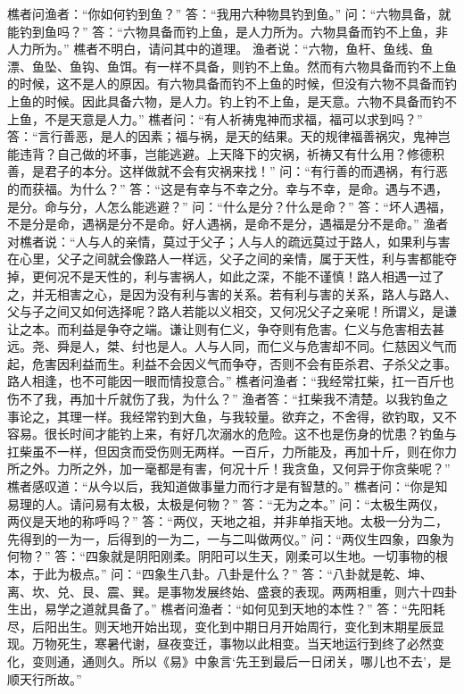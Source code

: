 \documentclass[12pt,UTF8]{ctexbook}
\begin{document}
樵者问渔者：“你如何钓到鱼？”
答：“我用六种物具钓到鱼。”
问：“六物具备，就能钓到鱼吗？”
答：“六物具备而钓上鱼，是人力所为。六物具备而钓不上鱼，非人力所为。”
樵者不明白，请问其中的道理。
渔者说：“六物，鱼杆、鱼线、鱼漂、鱼坠、鱼钩、鱼饵。有一样不具备，则钓不上鱼。然而有六物具备而钓不上鱼的时候，这不是人的原因。有六物具备而钓不上鱼的时候，但没有六物不具备而钓上鱼的时候。因此具备六物，是人力。钓上钓不上鱼，是天意。六物不具备而钓不上鱼，不是天意是人力。”
樵者问：“有人祈祷鬼神而求福，福可以求到吗？”
答：“言行善恶，是人的因素；福与祸，是天的结果。天的规律福善祸灾，鬼神岂能违背？自己做的坏事，岂能逃避。上天降下的灾祸，祈祷又有什么用？修德积善，是君子的本分。这样做就不会有灾祸来找！”
问：“有行善的而遇祸，有行恶的而获福。为什么？”
答：“这是有幸与不幸之分。幸与不幸，是命。遇与不遇，是分。命与分，人怎么能逃避？”
问：“什么是分？什么是命？”
答：“坏人遇福，不是分是命，遇祸是分不是命。好人遇祸，是命不是分，遇福是分不是命。”
渔者对樵者说：“人与人的亲情，莫过于父子；人与人的疏远莫过于路人，如果利与害在心里，父子之间就会像路人一样远，父子之间的亲情，属于天性，利与害都能夺掉，更何况不是天性的，利与害祸人，如此之深，不能不谨慎！路人相遇一过了之，并无相害之心，是因为没有利与害的关系。若有利与害的关系，路人与路人、父与子之间又如何选择呢？路人若能以义相交，又何况父子之亲呢！所谓义，是谦让之本。而利益是争夺之端。谦让则有仁义，争夺则有危害。仁义与危害相去甚远。尧、舜是人，桀、纣也是人。人与人同，而仁义与危害却不同。仁慈因义气而起，危害因利益而生。利益不会因义气而争夺，否则不会有臣杀君、子杀父之事。路人相逢，也不可能因一眼而情投意合。”
樵者问渔者：“我经常扛柴，扛一百斤也伤不了我，再加十斤就伤了我，为什么？”
渔者答：“扛柴我不清楚。以我钓鱼之事论之，其理一样。我经常钓到大鱼，与我较量。欲弃之，不舍得，欲钓取，又不容易。很长时间才能钓上来，有好几次溺水的危险。这不也是伤身的忧患？钓鱼与扛柴虽不一样，但因贪而受伤则无两样。一百斤，力所能及，再加十斤，则在你力所之外。力所之外，加一毫都是有害，何况十斤！我贪鱼，又何异于你贪柴呢？”
樵者感叹道：“从今以后，我知道做事量力而行才是有智慧的。”
樵者问：“你是知易理的人。请问易有太极，太极是何物？”
答：“无为之本。”
问：“太极生两仪，两仪是天地的称呼吗？”
答：“两仪，天地之祖，并非单指天地。太极一分为二，先得到的一为一，后得到的一为二，一与二叫做两仪。”
问：“两仪生四象，四象为何物？”
答：“四象就是阴阳刚柔。阴阳可以生天，刚柔可以生地。一切事物的根本，于此为极点。”
问：“四象生八卦。八卦是什么？”
答：“八卦就是乾、坤、离、坎、兑、艮、震、巽。是事物发展终始、盛衰的表现。两两相重，则六十四卦生出，易学之道就具备了。”
樵者问渔者：“如何见到天地的本性？”
答：“先阳耗尽，后阳出生。则天地开始出现，变化到中期日月开始周行，变化到末期星辰显现。万物死生，寒暑代谢，昼夜变迁，事物以此相变。当天地运行到终了必然变化，变则通，通则久。所以《易》中象言‘先王到最后一日闭关，哪儿也不去’，是顺天行所故。”
\end{document}
